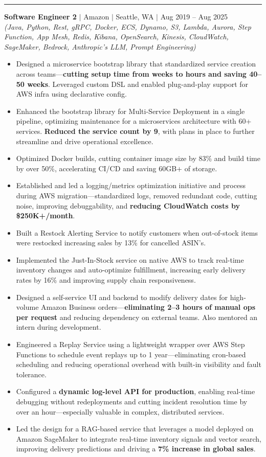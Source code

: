 \documentclass[10pt,letterpaper]{article}
\newcommand{\resumeItem}[1]{\item \small{#1}}
\newcommand{\role}[4]{
  \vspace{1.5pt}
  \textbf{#1} $|$ #2 $|$ #3 $|$ #4\\[-2pt]
}
\newcommand{\tech}[1]{\small\textit{(#1)}\vspace{1.5pt}}
\begin{document}
\vspace{2pt}
\hrule
\vspace{2pt}

\role{Software Engineer 2}{Amazon}{Seattle, WA}{Aug 2019 -- Aug 2025}
\tech{Java, Python, Rest, gRPC, Docker, ECS, Dynamo, S3, Lambda, Aurora, Step Function, App Mesh, Redis, Kibana, OpenSearch, Kinesis, CloudWatch, SageMaker, Bedrock, Anthropic’s LLM, Prompt Engineering}
\begin{itemize}
    \resumeItem{Designed a microservice bootstrap library that standardized service creation across teams---\textbf{cutting setup time from weeks to hours and saving 40--50 weeks}. Leveraged custom DSL and enabled plug-and-play support for AWS infra using declarative config.}
    \resumeItem{Enhanced the bootstrap library for Multi-Service Deployment in a single pipeline, optimizing maintenance for a microservices architecture with 60+ services. \textbf{Reduced the service count by 9}, with plans in place to further streamline and drive operational excellence.}
    \resumeItem{Optimized Docker builds, cutting container image size by 83\% and build time by over 50\%, accelerating CI/CD and saving 60GB+ of storage.}
    \resumeItem{Established and led a logging/metrics optimization initiative and process during AWS migration---standardized logs, removed redundant code, cutting noise, improving debuggability, and \textbf{reducing CloudWatch costs by \$250K+/month}.}
    \resumeItem{Built a Restock Alerting Service to notify customers when out-of-stock items were restocked increasing sales by 13\% for cancelled ASIN’s.}
    \resumeItem{Implemented the Just-In-Stock service on native AWS to track real-time inventory changes and auto-optimize fulfillment, increasing early delivery rates by 16\% and improving supply chain responsiveness.}
    \resumeItem{Designed a self-service UI and backend to modify delivery dates for high-volume Amazon Business orders---\textbf{eliminating 2–3 hours of manual ops per request} and reducing dependency on external teams. Also mentored an intern during development.}
    \resumeItem{Engineered a Replay Service using a lightweight wrapper over AWS Step Functions to schedule event replays up to 1 year---eliminating cron-based scheduling and reducing operational overhead with built-in visibility and fault tolerance.}
    \resumeItem{Configured a \textbf{dynamic log-level API for production}, enabling real-time debugging without redeployments and cutting incident resolution time by over an hour---especially valuable in complex, distributed services.}
    \resumeItem{Led the design for a RAG-based service that leverages a model deployed on Amazon SageMaker to integrate real-time inventory signals and vector search, improving delivery predictions and driving a \textbf{7\% increase in global sales}.}

\end{itemize}
\end{document}
